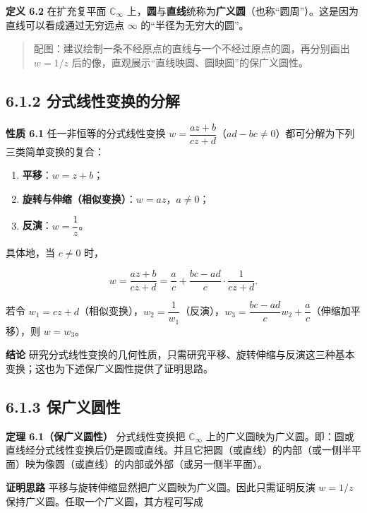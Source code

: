 \textbf{定义 6.2} 在扩充复平面 \(\mathbb{C}_{\infty}\)
上，\textbf{圆}与\textbf{直线}统称为\textbf{广义圆}（也称``圆周''）。这是因为直线可以看成通过无穷远点
\(\infty\) 的``半径为无穷大的圆''。

\begin{quote}
配图：建议绘制一条不经原点的直线与一个不经过原点的圆，再分别画出
\(w=1/z\) 后的像，直观展示``直线映圆、圆映圆''的保广义圆性。
\end{quote}

\subsection{6.1.2
分式线性变换的分解}\label{ux5206ux5f0fux7ebfux6027ux53d8ux6362ux7684ux5206ux89e3}

\textbf{性质 6.1} 任一非恒等的分式线性变换
\(w=\dfrac{az+b}{cz+d}\)（\(ad-bc\neq 0\)）都可分解为下列三类简单变换的复合：

\begin{enumerate}
\def\labelenumi{\arabic{enumi}.}
\tightlist
\item
  \textbf{平移}：\(w=z+b\)；
\item
  \textbf{旋转与伸缩（相似变换）}：\(w=az\)，\(a\neq 0\)；
\item
  \textbf{反演}：\(w=\dfrac{1}{z}\)。
\end{enumerate}

具体地，当 \(c\neq 0\) 时，

\[
w = \frac{az+b}{cz+d}
= \frac{a}{c} + \frac{bc-ad}{c}\cdot\frac{1}{cz+d}.
\]

若令
\(w_1=cz+d\)（相似变换），\(w_2=\dfrac{1}{w_1}\)（反演），\(w_3=\dfrac{bc-ad}{c}w_2+\dfrac{a}{c}\)（伸缩加平移），则
\(w=w_3\)。

\textbf{结论}
研究分式线性变换的几何性质，只需研究平移、旋转伸缩与反演这三种基本变换；这也为下述保广义圆性提供了证明思路。

\subsection{6.1.3 保广义圆性}\label{ux4fddux5e7fux4e49ux5706ux6027}

\textbf{定理 6.1（保广义圆性）} 分式线性变换把 \(\mathbb{C}_{\infty}\)
上的广义圆映为广义圆。即：圆或直线经分式线性变换后仍是圆或直线。并且它把圆（或直线）的内部（或一侧半平面）映为像圆（或直线）的内部或外部（或另一侧半平面）。

\textbf{证明思路} 平移与旋转伸缩显然把广义圆映为广义圆。因此只需证明反演
\(w=1/z\) 保持广义圆。任取一个广义圆，其方程可写成

